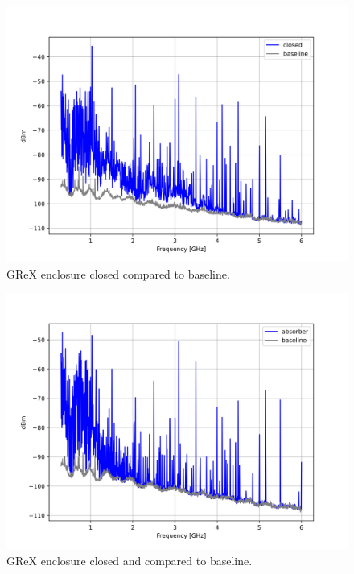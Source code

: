 \documentclass[12pt,a4paper,oneside]{article}
\begin{document}
\begin{figure}[H]
\centering
\includegraphics[width=1\linewidth]{Figures/closed_comparison_spectrum.jpg}
\caption{GReX enclosure closed compared to baseline.}
\label{fig:closed_result}
\end{figure}

\begin{figure}[H]
\centering
\includegraphics[width=1\linewidth]{Figures/absorber_comparison_spectrum.jpg}
\caption{GReX enclosure closed and compared to baseline.}
\label{fig:absorber_comparison_spectrum}
\end{figure}
\end{document}
